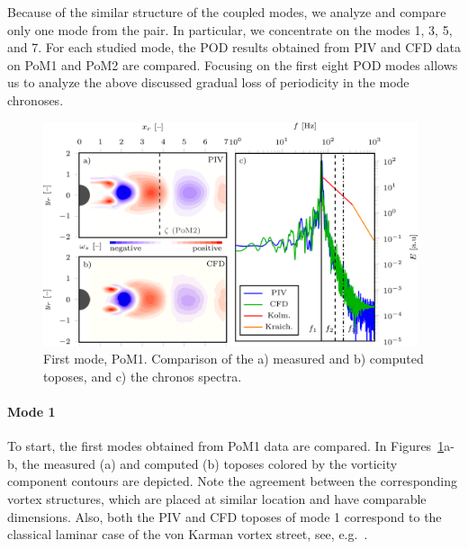 Because of the similar structure of the {coupled} modes, we analyze and compare only one mode from the pair. In particular, we concentrate on the modes 1, 3{, 5,} and 7. For each studied mode, the POD results obtained from PIV and CFD data on PoM1 and PoM2 are compared. {Focusing on the first eight POD modes allows us to analyze the above discussed gradual loss of periodicity in the mode chronoses.} 
\begin{figure}[htpb]
    \centering
    \includegraphics[width=0.98\textwidth]{02_images/00_export/figure11.png}
    \caption{{First mode, PoM1.} Comparison of the a) measured and b) computed toposes, and c) the chronos spectra.}
    \label{fig:pom1mod1}
\end{figure}


\paragraph{Mode 1}
To start, the first  mode{s} obtained from PoM1 data are compared. {In Figures~\ref{fig:pom1mod1}a-b, the measured (a) and computed (b) toposes colored by the }  vorticity component contours  are depicted. {Note the agreement between the corresponding vortex structures, which are placed at similar location and have comparable dimensions. Also, both the PIV and CFD toposes of mode 1 correspond} to the classical laminar case of the von Karman vortex street, {see, e.g.}~\cite{taira2020}. 

